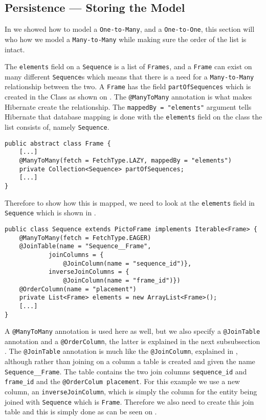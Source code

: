 \subsection{Persistence --- Storing the Model}
In  we showed how to model a \texttt{One-to-Many}, and a \texttt{One-to-One}, this section will who how we model a \texttt{Many-to-Many} while making sure the order of the list is intact.

The \texttt{elements} field on a \texttt{Sequence} is a list of \texttt{Frames}, and a \texttt{Frame} can exist on many different \texttt{Sequence}s which means that there is a need for a \texttt{Many-to-Many} relationship between the two.
A \texttt{Frame} has the field \texttt{partOfSequences} which is created in the Class as shown on .
The \texttt{@ManyToMany} annotation is what makes Hibernate create the relationship.
The \texttt{mappedBy = "elements"} argument tells Hibernate that database mapping is done with the \texttt{elements} field on the class the list consists of, namely \texttt{Sequence}.

\begin{lstlisting}[float, floatplacement=H, caption={The field \texttt{partOfSequences} in the \texttt{Frame} class.},label={lst:frame-sequence}]
public abstract class Frame {
	[...]
    @ManyToMany(fetch = FetchType.LAZY, mappedBy = "elements")
    private Collection<Sequence> partOfSequences;
    [...]
}
\end{lstlisting}

Therefore to show how this is mapped, we need to look at the \texttt{elements} field in \texttt{Sequence} which is shown in .

\begin{lstlisting}[float, floatplacement=H, caption={The field elements in the \texttt{Sequence} class.},label={lst:sequnce-frame}]
public class Sequence extends PictoFrame implements Iterable<Frame> {
    @ManyToMany(fetch = FetchType.EAGER)
    @JoinTable(name = "Sequence__Frame",
            joinColumns = {
                @JoinColumn(name = "sequence_id")},
            inverseJoinColumns = {
                @JoinColumn(name = "frame_id")})
    @OrderColumn(name = "placement")
    private List<Frame> elements = new ArrayList<Frame>();
    [...]
}
\end{lstlisting}

A \texttt{@ManyToMany} annotation is used here as well, but we also specify a \texttt{@JoinTable} annotation and a \texttt{@OrderColumn}, the latter is explained in the next subsubsection .
The \texttt{@JoinTable} annotation is much like the \texttt{@JoinColumn}, explained in , although rather than joining on a column a table is created and given the name \texttt{Sequence\_\_Frame}.
The table contains the two join columns \texttt{sequence\_id} and \texttt{frame\_id} and the \texttt{@OrderColum placement}.
For this example we use a new column, an \texttt{inverseJoinColumn}, which is simply the column for the entity being joined with \texttt{Sequence} which is \texttt{Frame}.
Therefore we also need to create this join table and this is simply done as can be seen on .

